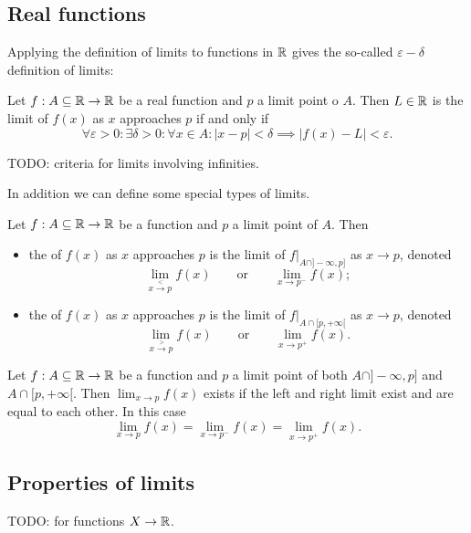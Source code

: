 \subsection{Real functions}
Applying the definition of limits to functions in $\mathbb{R}$ gives the so-called $\varepsilon-\delta$ definition of limits:
\begin{proposition}
Let $f:A\subseteq\mathbb{R}\to\mathbb{R}$ be a real function and $p$ a limit point o $A$. Then $L\in \mathbb{R}$ is the limit of $f(x)$ as $x$ approaches $p$ \textup{if and only if}
\[ \forall \varepsilon>0: \exists \delta> 0: \forall x\in A: |x-p| < \delta \implies |f(x)-L|<\varepsilon. \]
\end{proposition}
TODO: criteria for limits involving infinities.

In addition we can define some special types of limits.
\begin{definition}
Let $f:A\subseteq\mathbb{R}\to\mathbb{R}$ be a function and $p$ a limit point of $A$. Then
\begin{itemize}
\item the  of $f(x)$ as $x$ approaches $p$ is the limit of $f|_{A\cap]-\infty,p]}$ as $x\to p$, denoted
\[ \lim_{x\overset{<}{\to} p}f(x) \qquad \text{or} \qquad \lim_{x\to p^-}f(x); \]
\item the  of $f(x)$ as $x$ approaches $p$ is the limit of $f|_{A\cap[p,+\infty[}$ as $x\to p$, denoted
\[ \lim_{x\overset{>}{\to} p}f(x) \qquad \text{or} \qquad \lim_{x\to p^+}f(x). \]
\end{itemize}
\end{definition}

\begin{lemma}
Let $f:A\subseteq\mathbb{R}\to\mathbb{R}$ be a function and $p$ a limit point of both $A\cap]-\infty,p]$ and $A\cap[p,+\infty[$. Then $\lim_{x\to p} f(x)$ exists if the left and right limit exist and are equal to each other. In this case
\[ \lim_{x\to p} f(x) = \lim_{x\to p^-} f(x) = \lim_{x\to p^+} f(x). \]
\end{lemma}

\subsection{Properties of limits}
TODO: for functions $X\to \mathbb{R}$.

